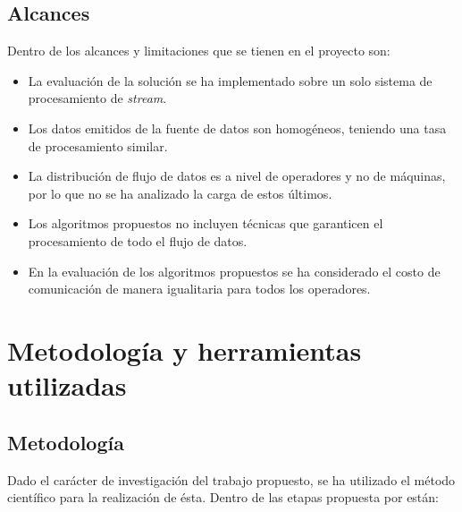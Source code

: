 \subsection{Alcances}
Dentro de los alcances y limitaciones que se tienen en el proyecto son:
\begin{itemize}
	\item La evaluación de la solución se ha implementado sobre un solo sistema de procesamiento de \textit{stream}.
	\item Los datos emitidos de la fuente de datos son homogéneos, teniendo una tasa de procesamiento similar.
	\item La distribución de flujo de datos es a nivel de operadores y no de máquinas, por lo que no se ha analizado la carga de estos \'ultimos.
	\item Los algoritmos propuestos no incluyen t\'ecnicas que garanticen el procesamiento de todo el flujo de datos.
	\item En la evaluación de los algoritmos propuestos se ha considerado el costo de comunicación de manera igualitaria para todos los operadores.
\end{itemize}


\section{Metodología y herramientas utilizadas}
\label{intro:metodologia}

\subsection{Metodología}
Dado el carácter de investigación del trabajo propuesto, se ha utilizado el método científico para la realización de ésta. Dentro de las etapas propuesta por \citep{hernandez2010metodologia} están:

